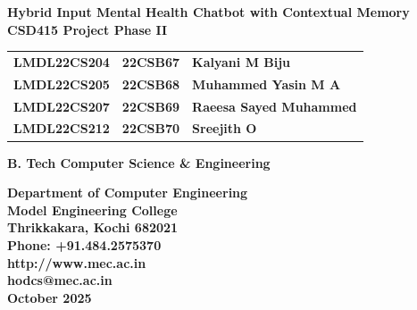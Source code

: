 \documentclass[11pt]{report}
\begin{document}
\begin{titlepage}
\begin{center}

\LARGE{\textbf{Hybrid Input Mental Health Chatbot with Contextual Memory}}\\
\vspace{0.6in}
\large{\textbf{CSD415 Project Phase II \\}}
\vspace{0.5in}

\begin{center}
\begin{tabular}{lll}
\Large \textbf{LMDL22CS204} & \Large \textbf{22CSB67} & \Large \textbf{Kalyani M Biju}\\
\Large \textbf{LMDL22CS205} & \Large \textbf{22CSB68} & \Large \textbf{Muhammed Yasin M A}\\
\Large \textbf{LMDL22CS207} & \Large \textbf{22CSB69} & \Large \textbf{Raeesa Sayed Muhammed}\\
\Large \textbf{LMDL22CS212} & \Large \textbf{22CSB70} & \Large \textbf{Sreejith O}\\
\end{tabular}
\end{center}

\vspace{0.20in}
\Large{\textbf{B. Tech Computer Science \& Engineering}}

\vspace{0.5in}
\begin{figure}[h]
\centering
{}
\end{figure}
\vspace{0.5in}

\textbf{
Department of Computer Engineering\\
Model Engineering College\\
Thrikkakara, Kochi 682021\\
Phone: +91.484.2575370\\
http://www.mec.ac.in \\
hodcs@mec.ac.in\\
\vspace{0.9in}
{\upshape October 2025}
}
\end{center}
\end{titlepage}
\end{document}
